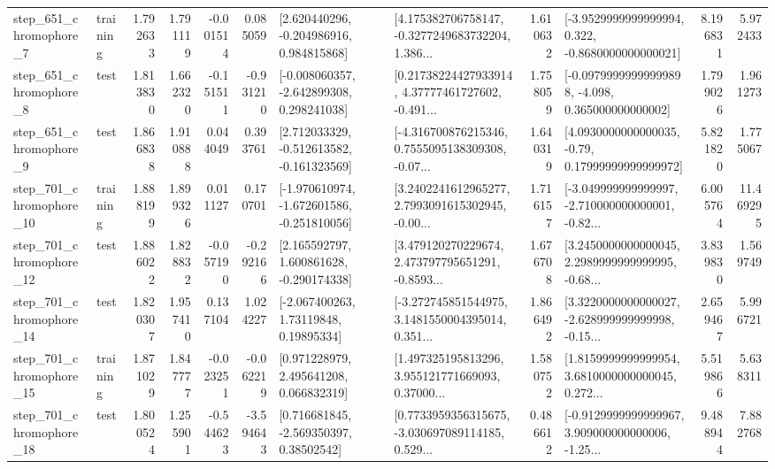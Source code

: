 \begin{tabular}{llrrrrllrlrr}
   step\_651\_chromophore\_7 &  training &      1.792633 &    1.791119 &     -0.001514 &  0.085059 &    [2.620440296, -0.204986916, 0.984815868] &  [4.175382706758147, -0.3277249683732204, 1.386... &       1.610632 &  [-3.9529999999999994, 0.322, -0.8680000000000021] &            8.196831 &          5.972433 \\
   step\_651\_chromophore\_8 &      test &      1.813830 &    1.662320 &     -0.151511 & -0.931210 &   [-0.008060357, -2.642899308, 0.298241038] &  [0.21738224427933914, 4.37777461727602, -0.491... &       1.758059 &  [-0.09799999999999898, -4.098, 0.365000000000002] &            1.799026 &          1.961273 \\
   step\_651\_chromophore\_9 &      test &      1.866838 &    1.910888 &      0.044049 &  0.393761 &   [2.712033329, -0.512613582, -0.161323569] &  [-4.316700876215346, 0.7555095138309308, -0.07... &       1.640319 &   [4.0930000000000035, -0.79, 0.17999999999999972] &            5.821820 &          1.775067 \\
  step\_701\_chromophore\_10 &  training &      1.888199 &    1.899326 &      0.011127 &  0.170701 &  [-1.970610974, -1.672601586, -0.251810056] &  [3.2402241612965277, 2.7993091615302945, -0.00... &       1.716157 &  [-3.049999999999997, -2.710000000000001, -0.82... &            6.005764 &         11.469295 \\
  step\_701\_chromophore\_12 &      test &      1.886022 &    1.828832 &     -0.057190 & -0.292166 &    [2.165592797, 1.600861628, -0.290174338] &  [3.479120270229674, 2.473797795651291, -0.8593... &       1.676708 &  [3.2450000000000045, 2.2989999999999995, -0.68... &            3.839830 &          1.569749 \\
  step\_701\_chromophore\_14 &      test &      1.820307 &    1.957410 &      0.137104 &  1.024227 &      [-2.067400263, 1.73119848, 0.19895334] &  [-3.272745851544975, 3.1481550004395014, 0.351... &       1.866492 &  [3.3220000000000027, -2.628999999999998, -0.15... &            2.659467 &          5.996721 \\
  step\_701\_chromophore\_15 &  training &      1.871029 &    1.847777 &     -0.023251 & -0.062219 &     [0.971228979, 2.495641208, 0.066832319] &  [1.497325195813296, 3.955121771669093, 0.37000... &       1.580752 &  [1.8159999999999954, 3.6810000000000045, 0.272... &            5.519866 &          5.638311 \\
  step\_701\_chromophore\_18 &      test &      1.800524 &    1.255901 &     -0.544623 & -3.594643 &     [0.716681845, -2.569350397, 0.38502542] &  [0.7733959356315675, -3.030697089114185, 0.529... &       0.486612 &  [-0.9129999999999967, 3.909000000000006, -1.25... &            9.488944 &          7.882768 \\

\end{tabular}
